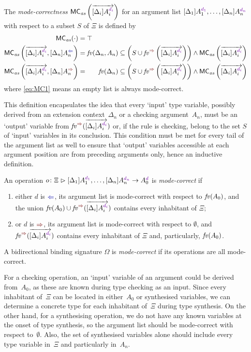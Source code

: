 \begin{definition}\label{def:mode-correctness-args}
  The \emph{mode-correctness} $\MCas\left(\biargvec\right)$ for an argument list $\biargs$ with respect to a subset $S$ of $\Xi$ is defined by
  \begin{align}
    \label{eq:MC1} \MCas( \cdot ) & = \top \\
    \label{eq:MC3} \MCas\left(\biargvec, \chkbiarg[n]\right)
                                  & = \fv(\Delta_n, A_n) \subseteq \left( S \cup \synvar\left(\biargvec\right)\right) \land \MCas\left(\biargvec\right) \\
    \label{eq:MC2} \MCas\left(\biargvec, \synbiarg[n]\right) 
                                  & = \phantom{, A_n} \fv(\Delta_n) \subseteq \left( S \cup \synvar\left(\biargvec\right)\right) \land  \MCas\left(\biargvec\right)
  \end{align}
  where \eqref{eq:MC1} means an empty list is always mode-correct.
\end{definition}
This definition encapsulates the idea that every `input' type variable, possibly derived from an extension context~$\Delta_n$ or a checking argument~$A_n$, must be an `output' variable from $\synvar(\biargvec)$ or, if the rule is checking, belong to the set $S$ of `input' variables in its conclusion.
This condition must be met for every tail of the argument list as well to ensure that `output' variables accessible at each argument position are from preceding arguments only, hence an inductive definition.
\begin{definition}\label{def:mode-correctness}
  An operation $\biop$ is \emph{mode-correct} if 
  \begin{enumerate}
    \item either $d$ is $\chk$, its argument list is mode-correct with respect to $\mathit{fv}(A_0)$, and the union $\fv(A_0) \cup \synvar(\biargvec)$ contains every inhabitant of $\Xi$;
    \item or $d$ is $\syn$, its argument list is mode-correct with respect to $\emptyset$, and $\synvar(\biargvec)$ contains every inhabitant of $\Xi$ and, particularly, $\mathit{fv}(A_0)$.
  \end{enumerate}
  A bidirectional binding signature $\Omega$ is \emph{mode-correct} if its operations are all mode-correct.
\end{definition}
For a checking operation, an `input' variable of an argument could be derived from~$A_0$, as these are known during type checking as an input.
Since every inhabitant of~$\Xi$ can be located in either~$A_0$ or synthesised variables, we can determine a concrete type for each inhabitant of~$\Xi$ during type synthesis.
On the other hand, for a synthesising operation, we do not have any known variables at the onset of type synthesis, so the argument list should be mode-correct with respect to~$\emptyset$.
Also, the set of synthesised variables alone should include every type variable in~$\Xi$ and particularly in~$A_n$.

